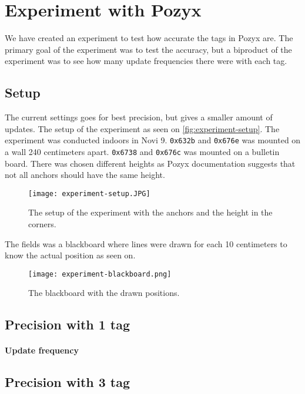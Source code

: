 \section{Experiment with Pozyx}
We have created an experiment to test how accurate the tags in Pozyx are.
The primary goal of the experiment was to test the accuracy, but a biproduct of the experiment was to see how many update frequencies there were with each tag.


\subsection{Setup}
The current settings goes for best precision, but gives a smaller amount of updates.
The setup of the experiment as seen on \autoref{fig:experiment-setup}. 
The experiment was conducted indoors in Novi 9. 
\texttt{0x632b} and \texttt{0x676e} was mounted on a wall 240 centimeters apart.
\texttt{0x6738} and \texttt{0x676c} was mounted on a bulletin board.
There was chosen different heights as Pozyx documentation suggests that not all anchors should have the same height.

\begin{figure}[H]
    \centering
    \texttt{[image: experiment-setup.JPG]}
    \caption{The setup of the experiment with the anchors and the height in the corners.}
    \label{fig:experiment-setup}
\end{figure}
\noindent
The fields was a blackboard where lines were drawn for each 10 centimeters to know the actual position as seen on.

\begin{figure}[H]
    \centering
    \texttt{[image: experiment-blackboard.png]}
    \caption{The blackboard with the drawn positions.}
    \label{fig:experiment-blackboard}
\end{figure}
 
\subsection{Precision with 1 tag}

\paragraph{Update frequency}

\subsection{Precision with 3 tag}

